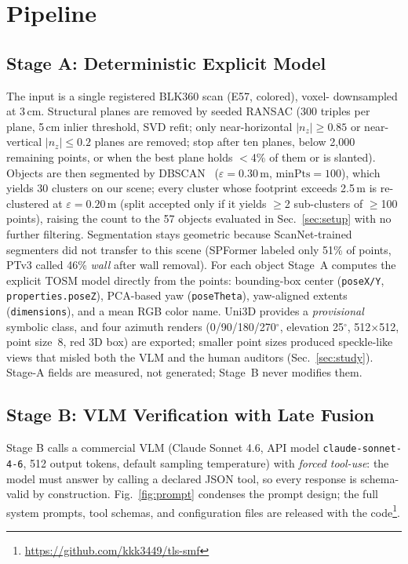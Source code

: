 \documentclass[conference]{IEEEtran}
\begin{document}
\section{Pipeline}

\subsection{Stage A: Deterministic Explicit Model}
\label{sec:stagea}
The input is a single registered BLK360 scan (E57, colored), voxel-
downsampled at 3\,cm. Structural planes are removed by seeded RANSAC
(300 triples per plane, 5\,cm inlier threshold, SVD refit; only
near-horizontal $|n_z|\ge0.85$ or near-vertical $|n_z|\le0.2$ planes are
removed; stop after ten planes, below 2{,}000 remaining points, or when
the best plane holds $<$4\% of them or is slanted). Objects are then
segmented by DBSCAN~\cite{ester1996} ($\varepsilon=0.30$\,m,
$\mathrm{minPts}=100$), which yields 30 clusters on our scene; every
cluster whose footprint exceeds 2.5\,m is re-clustered at
$\varepsilon=0.20$\,m (split accepted only if it yields $\ge$2
sub-clusters of $\ge$100 points), raising the count to the 57 objects
evaluated in Sec.~\ref{sec:setup} with no further filtering.
Segmentation stays geometric because ScanNet-trained segmenters did not
transfer to this scene (SPFormer labeled only 51\% of points, PTv3 called
46\% \emph{wall} after wall removal). For each object Stage~A
computes the explicit TOSM model directly from the points: bounding-box
center (\texttt{poseX/Y}, \texttt{properties.poseZ}), PCA-based yaw
(\texttt{poseTheta}), yaw-aligned extents (\texttt{dimensions}), and a mean
RGB color name. Uni3D provides a \emph{provisional} symbolic class, and four
azimuth renders (0/90/180/270$^{\circ}$, elevation 25$^{\circ}$,
512$\times$512, point size~8, red 3D box) are exported; smaller point
sizes produced speckle-like views that misled both the VLM and the human
auditors (Sec.~\ref{sec:study}). Stage-A fields are measured, not
generated; Stage~B never modifies them.

\subsection{Stage B: VLM Verification with Late Fusion}
\label{sec:stageb}
Stage B calls a commercial VLM (Claude Sonnet 4.6, API model
\texttt{claude-sonnet-4-6}, 512 output tokens, default sampling
temperature) with \emph{forced tool-use}: the model must answer by calling
a declared JSON tool, so every response is schema-valid by construction.
Fig.~\ref{fig:prompt} condenses the prompt design; the full system prompts,
tool schemas, and configuration files are released with the
code\footnote{\url{https://github.com/kkk3449/tls-smf}}.
\end{document}
